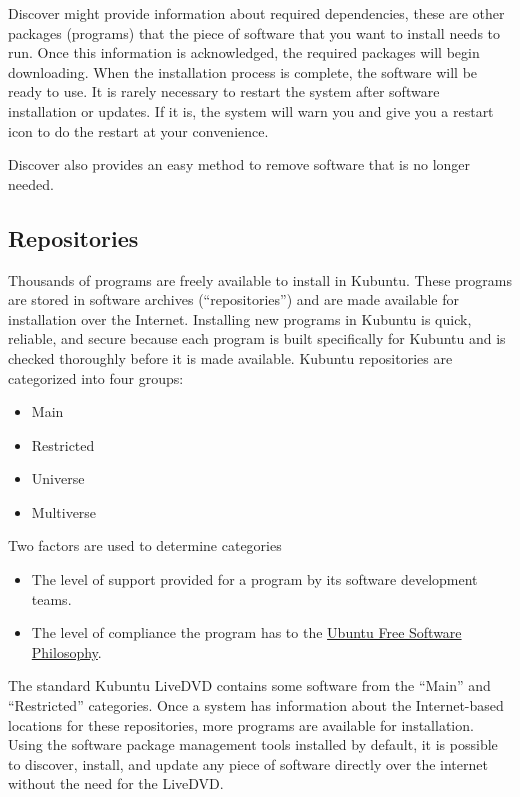 \documentclass[letterpaper,10pt,english]{sphinxmanual}
\begin{document}
\noindent{}

Discover might provide information about required dependencies, these are other packages (programs) that the piece of software that you want to install needs to run. Once this information is acknowledged, the required packages will begin downloading. When the installation process is complete, the software will be ready to use. It is rarely necessary to restart the system after software installation or updates. If it is, the system will warn you and give you a restart icon to do the restart at your convenience.

Discover also provides an easy method to remove software that is no longer needed.


\subsection{Repositories}
\label{\detokenize{docs/advanced:repositories}}
Thousands of programs are freely available to install in Kubuntu. These programs are stored in software archives (``repositories'') and are made available for installation over the Internet. Installing new programs in Kubuntu is quick, reliable, and secure because each program is built specifically for Kubuntu and is checked thoroughly before it is made available. Kubuntu repositories are categorized into four groups:
\begin{itemize}
\item {} 
Main

\item {} 
Restricted

\item {} 
Universe

\item {} 
Multiverse

\end{itemize}

Two factors are used to determine categories
\begin{itemize}
\item {} 
The level of support provided for a program by its software development teams.

\item {} 
The level of compliance the program has to the \href{http://www.ubuntu.com/about/about-ubuntu/our-philosophy}{Ubuntu Free Software Philosophy}.

\end{itemize}

The standard Kubuntu LiveDVD contains some software from the ``Main'' and ``Restricted'' categories. Once a system has information about the Internet-based locations for these repositories, more programs are available for installation. Using the software package management tools installed by default, it is possible to discover, install, and update any piece of software directly over the internet without the need for the LiveDVD.
\end{document}
